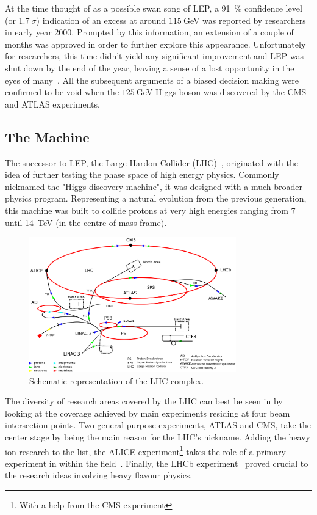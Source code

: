\hspace{10pt} At the time thought of as a possible swan song of LEP, a 91~\% confidence level (or 1.7$~\sigma$) indication of an excess at around $115~$GeV was reported by researchers in early year 2000. Prompted by this information, an extension of a couple of months was approved in order to further explore this appearance. Unfortunately for researchers, this time didn't yield any significant improvement and LEP was shut down by the end of the year, leaving a sense of a lost opportunity in the eyes of many~\cite{LEP_searches}. All the subsequent arguments of a biased decision making were confirmed to be void when the $125~$GeV Higgs boson was discovered by the CMS and ATLAS experiments.


\subsection{The Machine}
\hspace{10pt} The successor to LEP, the Large Hardon Collider (LHC)~\cite{LHC_TDR}, originated with the idea of further testing the phase space of high energy physics. Commonly nicknamed the "Higgs discovery machine", it was designed with a much broader physics program. Representing a natural evolution from the previous generation, this machine was built to collide protons at very high energies ranging from 7 until 14~TeV (in the centre of mass frame).

\begin{figure}[htbp]
  \centering
    \includegraphics[width=0.8\textwidth]{CMS_experiment/LHC.png}
  \caption[Schematic representation of the LHC complex.]{Schematic representation of the LHC complex.}
  \label{fig:lhc}
\end{figure}

\hspace{10pt} The diversity of research areas covered by the LHC can best be seen in by looking at the coverage achieved by main experiments residing at four beam intersection points. Two general purpose experiments, ATLAS and CMS, take the center stage by being the main reason for the LHC's nickname. Adding the heavy ion research to the list, the ALICE experiment\footnote{With a help from the CMS experiment} takes the role of a primary experiment in within the field~\cite{ALICE_paper}. Finally, the LHCb experiment~\cite{LHCb_paper} proved crucial to the research ideas involving heavy flavour physics.

